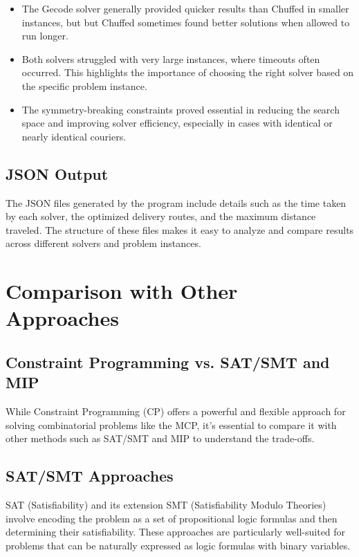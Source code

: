 \documentclass{article}
\begin{document}
\begin{itemize}
    \item The Gecode solver generally provided quicker results than Chuffed in smaller instances, but    but Chuffed sometimes found better solutions when allowed to run longer.
    \item Both solvers struggled with very large instances, where timeouts often occurred. This highlights the importance of choosing the right solver based on the specific problem instance.
    \item The symmetry-breaking constraints proved essential in reducing the search space and improving solver efficiency, especially in cases with identical or nearly identical couriers.
\end{itemize}

\subsection{JSON Output}

The JSON files generated by the program include details such as the time taken by each solver, the optimized delivery routes, and the maximum distance traveled. The structure of these files makes it easy to analyze and compare results across different solvers and problem instances.

\section{Comparison with Other Approaches}

\subsection{Constraint Programming vs. SAT/SMT and MIP}

While Constraint Programming (CP) offers a powerful and flexible approach for solving combinatorial problems like the MCP, it's essential to compare it with other methods such as SAT/SMT and MIP to understand the trade-offs.

\subsection{SAT/SMT Approaches}

SAT (Satisfiability) and its extension SMT (Satisfiability Modulo Theories) involve encoding the problem as a set of propositional logic formulas and then determining their satisfiability. These approaches are particularly well-suited for problems that can be naturally expressed as logic formulas with binary variables.
\end{document}
